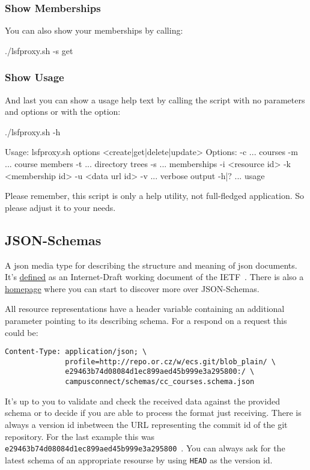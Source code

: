 \subsubsection{Show Memberships}
You can also show your memberships by calling:
\begin{code}
  ./lsfproxy.sh -s get
\end{code}

\subsubsection{Show Usage}
And last you can show a usage help text by calling the script with no
parameters and options or with the  option:
\begin{code}
  ./lsfproxy.sh -h

  Usage: lsfproxy.sh options <create|get|delete|update>
  Options:
    -c ... courses
    -m ... course members
    -t ... directory trees
    -s ... memberships
    -i <resource id>
    -k <membership id>
    -u <data url id>
    -v   ... verbose output
    -h|? ... usage
\end{code}
Please remember, this script is only a help utility, not full-fledged
application. So please adjust it to your needs. 

\hypertarget{campusconnect_json_schemas}{}
\subsection{JSON-Schemas}
A json media type for describing the structure and meaning of json documents.
It's \href{http://tools.ietf.org/html/draft-zyp-json-schema-03}{defined} as an
Internet-Draft working document of the IETF~. There is also a \href{http://json-schema.org}{homepage} where you can
start to discover more over JSON-Schemas.

All resource representations have a  header variable
containing an additional parameter  pointing to its describing
schema. For a respond on a  request this could be:
\begin{verbatim}
Content-Type: application/json; \
              profile=http://repo.or.cz/w/ecs.git/blob_plain/ \
              e29463b74d08084d1ec899aed45b999e3a295800:/ \
              campusconnect/schemas/cc_courses.schema.json
\end{verbatim}
It's up to you to validate and check the received data against the provided
schema or to decide if you are able to process the format just receiving. There
is always a version id inbetween the  URL representing the commit
id of the git repository. For the last \hv{Content-Type} example this was
\verb!e29463b74d08084d1ec899aed45b999e3a295800!~. You can always ask for the
latest schema of an appropriate resourse by using \verb!HEAD! as the version
id.

